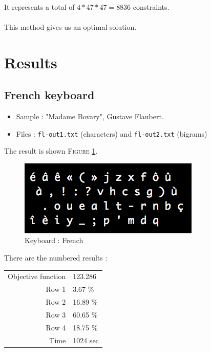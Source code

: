 \documentclass[a4paper,titlepage]{article}
\begin{document}
\paragraph{}
It represents a total of $4 * 47 * 47 = 8836$ constraints.

\paragraph{}

This method gives us an optimal solution.

\section{Results}

	\subsection{French keyboard}

\begin{itemize}
	\item Sample : "Madame Bovary", Gustave Flaubert.
	\item Files : \texttt{fl-out1.txt} (characters) and \texttt{fl-out2.txt} (bigrams)
\end{itemize}
The result is shown \textsc{Figure} \ref{french}.
\begin{figure}[h]
	\centering
	\includegraphics[scale=1]{images/Francais.png}
	\caption{Keyboard : French}
	\label{french}
\end{figure}

There are the numbered results : 
\begin{center}
	\begin{tabular}{r|l}
		Objective function & 123.286\\
		Row 1 & 3.67 \%\\
		Row 2 & 16.89 \%\\
		Row 3 & 60.65 \%\\
		Row 4 & 18.75 \%\\
		Time & 1024 sec
	\end{tabular}
\end{center}
\end{document}
